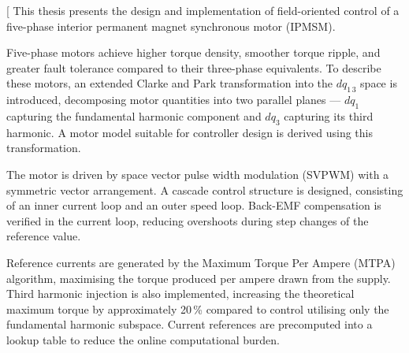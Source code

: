 
\date{10.\,06.\,2026} 


\abstract[%
This thesis presents the design and implementation of field-oriented control of a five-phase interior permanent magnet synchronous motor (IPMSM).

Five-phase motors achieve higher torque density, smoother torque ripple, and greater fault tolerance compared to their three-phase equivalents. To describe these motors, an extended Clarke and Park transformation into the $dq_{1\,3}$ space is introduced, decomposing motor quantities into two parallel planes --- $dq_1$ capturing the fundamental harmonic component and $dq_3$ capturing its third harmonic. A motor model suitable for controller design is derived using this transformation.

The motor is driven by space vector pulse width modulation (SVPWM) with a symmetric vector arrangement. A cascade control structure is designed, consisting of an inner current loop and an outer speed loop. Back-EMF compensation is verified in the current loop, reducing overshoots during step changes of the reference value.

Reference currents are generated by the Maximum Torque Per Ampere (MTPA) algorithm, maximising the torque produced per ampere drawn from the supply. Third harmonic injection is also implemented, increasing the theoretical maximum torque by approximately 20\,\% compared to control utilising only the fundamental harmonic subspace. Current references are precomputed into a lookup table to reduce the online computational burden.

